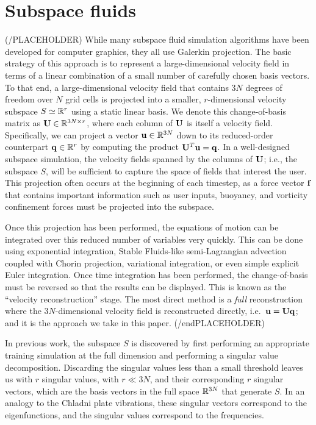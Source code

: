 \documentclass[11pt]{article}
\begin{document}
\section*{Subspace fluids}
(/PLACEHOLDER)
While many subspace fluid simulation algorithms have been developed for computer graphics, they all use Galerkin projection. The basic strategy of this approach is to represent a large-dimensional velocity field in terms of a linear combination of a small number of carefully chosen basis vectors. To that end, a large-dimensional velocity field that contains $3N$ degrees of freedom over $N$ grid cells is projected into a smaller, $r$-dimensional velocity subspace $S \simeq \mathbb{R}^{r}$ using a static linear basis. We denote this change-of-basis matrix as $\mathbf{U} \in \mathbb{R}^{3N \times r}$, where each column of $\mathbf{U}$ is itself a velocity field. Specifically, we can project a vector $\mathbf{u} \in \mathbb{R}^{3N}$ down to its reduced-order counterpart $\mathbf{q} \in \mathbb{R}^r$ by computing the product $\mathbf{U}^T \mathbf{u} = \mathbf{q}$. In a well-designed subspace simulation, the velocity fields spanned by the columns of $\mathbf{U}$; i.e., the subspace $S$, will be sufficient to capture the space of fields that interest the user. This projection often occurs at the beginning of each timestep, as a force vector $\mathbf{f}$ that contains important information such as user inputs, buoyancy, and vorticity confinement forces must be projected into the subspace.

Once this projection has been performed, the equations of motion can be integrated over this reduced number of variables very quickly. This can be done using exponential integration, Stable Fluids-like semi-Lagrangian advection coupled with Chorin projection, variational integration, or even simple explicit Euler integration. Once time integration has been performed, the change-of-basis must be reversed so that the results can be displayed. This is known as the ``velocity reconstruction'' stage. The most direct method is a {\em full} reconstruction where the $3N$-dimensional velocity field is reconstructed directly, i.e.~$\mathbf{u} = \mathbf{U}\mathbf{q}$; and it is the approach we take in this paper.
(/endPLACEHOLDER)

In previous work, the subspace $S$ is discovered by first performing an appropriate training simulation at the full dimension and performing a singular value decomposition. Discarding the singular values less than a small threshold leaves us with $r$ singular values, with $r \ll 3N$, and their corresponding $r$ singular vectors, which are the basis vectors in the full space $\mathbb{R}^{3N}$ that generate $S$. In an analogy to the Chladni plate vibrations, these singular vectors correspond to the eigenfunctions, and the singular values correspond to the frequencies.
\end{document}
